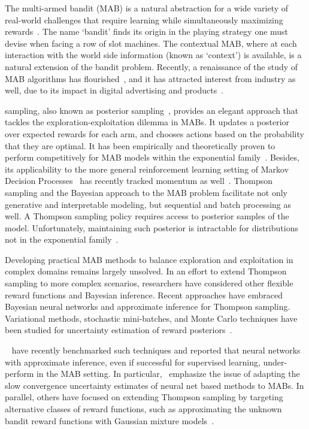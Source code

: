 \documentclass{article}
\begin{document}
The multi-armed bandit (MAB) is a natural abstraction for a wide variety of real-world challenges that require learning while simultaneously maximizing rewards~\cite{j-Lai1985, b-Lattimore2019}. The name `bandit' finds its origin in the playing strategy one must devise when facing a row of slot machines. The contextual MAB, where at each interaction with the world side information (known as `context') is available, is a natural extension of the bandit problem. Recently, a renaissance of the study of MAB algorithms has flourished~\cite{j-Agrawal2011,ip-Maillard2011}, and it has attracted interest from industry as well, due to its impact in digital advertising and products~\cite{j-Li2010, ic-Chapelle2011}. 

\citet{j-Thompson1933} sampling, also known as posterior sampling~\cite{j-Russo2014}, provides an elegant approach that tackles the exploration-exploitation dilemma in MABs. It updates a posterior over expected rewards for each arm, and chooses actions based on the probability that they are optimal. It has been empirically and theoretically proven to perform competitively for MAB models within the exponential family~\cite{ic-Chapelle2011,j-Agrawal2012,j-Agrawal2012a,ic-Korda2013}. Besides, its applicability to the more general reinforcement learning setting of Markov Decision Processes~\cite{j-Burnetas1997} has recently tracked momentum as well~\cite{ip-Gopalan2015,ic-Ouyang2017}.
Thompson sampling and the Bayesian approach to the MAB problem facilitate not only generative and interpretable modeling, but sequential and batch processing as well.
A Thompson sampling policy requires access to posterior samples of the model. Unfortunately, maintaining such posterior is intractable for distributions not in the exponential family~\cite{ic-Korda2013,j-Russo2018}.

Developing practical MAB methods to balance exploration and exploitation in complex domains remains largely unsolved.
In an effort to extend Thompson sampling to more complex scenarios, researchers have considered other flexible reward functions and Bayesian inference.
Recent approaches have embraced Bayesian neural networks and approximate inference for Thompson sampling. Variational methods, stochastic mini-batches, and Monte Carlo techniques have been studied for uncertainty estimation of reward posteriors~\cite{ip-Blundell2015, ic-Kingma2015, j-Lipton2016, ic-Osband2016, ip-Li2016}.

~\citet{ip-Riquelme2018} have recently benchmarked such techniques and reported that neural networks with approximate inference, even if successful for supervised learning, under-perform in the MAB setting. In particular,~\citet{ip-Riquelme2018} emphasize the issue of adapting the slow convergence uncertainty estimates of neural net based methods to MABs. In parallel, others have focused on extending Thompson sampling by targeting alternative classes of reward functions, such as approximating the unknown bandit reward functions with Gaussian mixture models~\cite{ip-Urteaga2018}.
\end{document}
